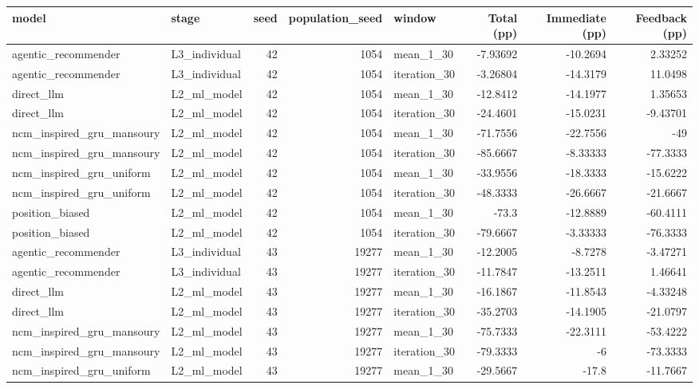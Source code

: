 \begin{table}[htbp!]
\centering
\small
\setlength{\tabcolsep}{3pt}
\renewcommand{\arraystretch}{1.1}
\begin{tabular}{llrrlrrr}
\hline
model & stage & seed & population\_seed & window & Total (pp) & Immediate (pp) & Feedback (pp) \\
\hline
agentic\_recommender & L3\_individual & 42 & 1054 & mean\_1\_30 & -7.93692 & -10.2694 & 2.33252 \\
agentic\_recommender & L3\_individual & 42 & 1054 & iteration\_30 & -3.26804 & -14.3179 & 11.0498 \\
direct\_llm & L2\_ml\_model & 42 & 1054 & mean\_1\_30 & -12.8412 & -14.1977 & 1.35653 \\
direct\_llm & L2\_ml\_model & 42 & 1054 & iteration\_30 & -24.4601 & -15.0231 & -9.43701 \\
ncm\_inspired\_gru\_mansoury & L2\_ml\_model & 42 & 1054 & mean\_1\_30 & -71.7556 & -22.7556 & -49 \\
ncm\_inspired\_gru\_mansoury & L2\_ml\_model & 42 & 1054 & iteration\_30 & -85.6667 & -8.33333 & -77.3333 \\
ncm\_inspired\_gru\_uniform & L2\_ml\_model & 42 & 1054 & mean\_1\_30 & -33.9556 & -18.3333 & -15.6222 \\
ncm\_inspired\_gru\_uniform & L2\_ml\_model & 42 & 1054 & iteration\_30 & -48.3333 & -26.6667 & -21.6667 \\
position\_biased & L2\_ml\_model & 42 & 1054 & mean\_1\_30 & -73.3 & -12.8889 & -60.4111 \\
position\_biased & L2\_ml\_model & 42 & 1054 & iteration\_30 & -79.6667 & -3.33333 & -76.3333 \\
agentic\_recommender & L3\_individual & 43 & 19277 & mean\_1\_30 & -12.2005 & -8.7278 & -3.47271 \\
agentic\_recommender & L3\_individual & 43 & 19277 & iteration\_30 & -11.7847 & -13.2511 & 1.46641 \\
direct\_llm & L2\_ml\_model & 43 & 19277 & mean\_1\_30 & -16.1867 & -11.8543 & -4.33248 \\
direct\_llm & L2\_ml\_model & 43 & 19277 & iteration\_30 & -35.2703 & -14.1905 & -21.0797 \\
ncm\_inspired\_gru\_mansoury & L2\_ml\_model & 43 & 19277 & mean\_1\_30 & -75.7333 & -22.3111 & -53.4222 \\
ncm\_inspired\_gru\_mansoury & L2\_ml\_model & 43 & 19277 & iteration\_30 & -79.3333 & -6 & -73.3333 \\
ncm\_inspired\_gru\_uniform & L2\_ml\_model & 43 & 19277 & mean\_1\_30 & -29.5667 & -17.8 & -11.7667 \\

\end{tabular}
\end{table}
